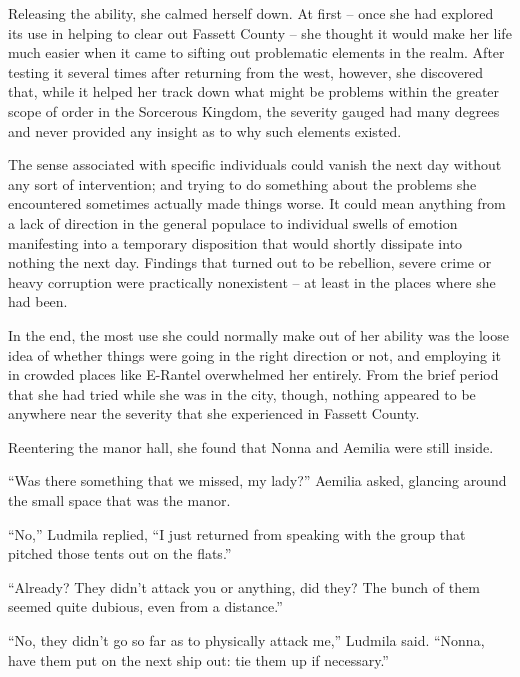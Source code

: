  

Releasing the ability, she calmed herself down. At first – once she had explored its use in helping to clear out Fassett County – she thought it would make her life much easier when it came to sifting out problematic elements in the realm. After testing it several times after returning from the west, however, she discovered that, while it helped her track down what might be problems within the greater scope of order in the Sorcerous Kingdom, the severity gauged had many degrees and never provided any insight as to why such elements existed.

 

The sense associated with specific individuals could vanish the next day without any sort of intervention; and trying to do something about the problems she encountered sometimes actually made things worse. It could mean anything from a lack of direction in the general populace to individual swells of emotion manifesting into a temporary disposition that would shortly dissipate into nothing the next day. Findings that turned out to be rebellion, severe crime or heavy corruption were practically nonexistent – at least in the places where she had been.

 

In the end, the most use she could normally make out of her ability was the loose idea of whether things were going in the right direction or not, and employing it in crowded places like E-Rantel overwhelmed her entirely. From the brief period that she had tried while she was in the city, though, nothing appeared to be anywhere near the severity that she experienced in Fassett County.

 

Reentering the manor hall, she found that Nonna and Aemilia were still inside.

 

“Was there something that we missed, my lady?” Aemilia asked, glancing around the small space that was the manor.

 

“No,” Ludmila replied, “I just returned from speaking with the group that pitched those tents out on the flats.”

 

“Already? They didn’t attack you or anything, did they? The bunch of them seemed quite dubious, even from a distance.”

 

“No, they didn’t go so far as to physically attack me,” Ludmila said. “Nonna, have them put on the next ship out: tie them up if necessary.”

